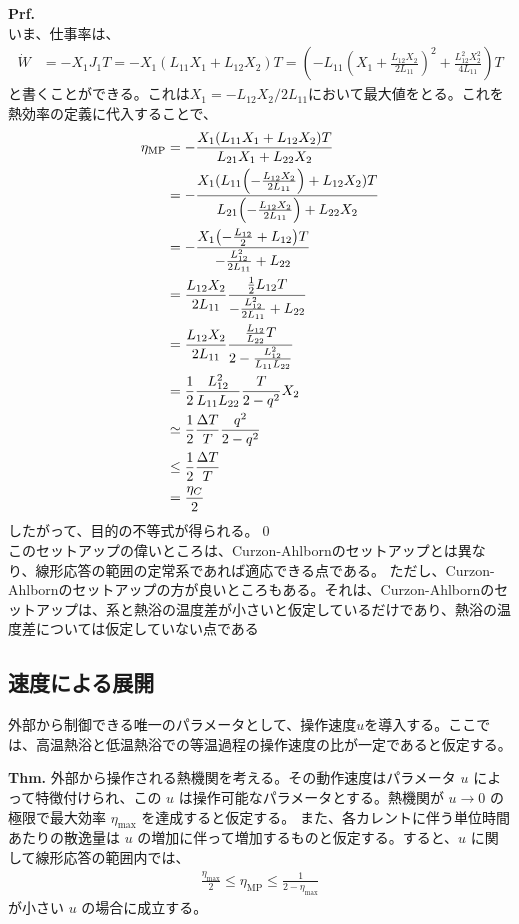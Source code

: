 \documentclass[a4paper,10.5pt]{jsarticle}
\numberwithin{equation}{section}
\begin{document}
\textbf{Prf.}\\
いま、仕事率は、
\begin{align}
  \dot{W} &= -X_1 J_1 T =-X_1(L_{11} X_1 + L_{12} X_2) T = \left(-L_{11} \left( X_1 + \frac{L_{12} X_2}{2 L_{11}} \right)^2 + \frac{L_{12}^2 X_2^2}{4 L_{11}} \right) T
\end{align}
と書くことができる。これは$X_1 = -L_{12} X_2 / 2 L_{11}$において最大値をとる。これを熱効率の定義に代入することで、
\begin{align}
  \eta_{\text{MP}} &= -\frac{X_1(L_{11} X_1 + L_{12} X_2) T}{L_{21} X_1 + L_{22} X_2} \\
  &= -\frac{X_1(L_{11}\qty(-\frac{L_{12} X_2}{2 L_{11}}) + L_{12} X_2) T}{L_{21} \qty(-\frac{L_{12} X_2}{2 L_{11}}) + L_{22} X_2} \\
  &= -\frac{X_1\qty(-\frac{L_{12}}{2}+ L_{12})T}{-\frac{L_{12}^2}{2L_{11}} + L_{22}} \\
  &= \frac{L_{12} X_2}{2 L_{11} }\frac{\frac{1}{2}L_{12}T}{-\frac{L_{12}^2}{2L_{11}} + L_{22}} \\
  &= \frac{L_{12} X_2}{2 L_{11} }\frac{\frac{L_{12}}{L_{22}}T}{2-\frac{L_{12}^2}{L_{11}L_{22}} } \\
  &= \frac{1}{2} \frac{L_{12}^2}{L_{11}L_{22}} \frac{T}{2-q^2}X_2\\
  &\simeq \frac{1}{2} \frac{\Delta T}{T} \frac{q^2}{2 - q^2} \\
  &\leq \frac{1}{2} \frac{\Delta T}{T}\\
  &= \frac{\eta_C}{2}
\end{align}
したがって、目的の不等式が得られる。\qed\\
このセットアップの偉いところは、Curzon-Ahlbornのセットアップとは異なり、線形応答の範囲の定常系であれば適応できる点である。
ただし、Curzon-Ahlbornのセットアップの方が良いところもある。それは、Curzon-Ahlbornのセットアップは、系と熱浴の温度差が小さいと仮定しているだけであり、熱浴の温度差については仮定していない点である

\subsection{速度による展開}
外部から制御できる唯一のパラメータとして、操作速度$u$を導入する。ここでは、高温熱浴と低温熱浴での等温過程の操作速度の比が一定であると仮定する。
\begin{itembox}[l]{\textbf{Thm.}}
外部から操作される熱機関を考える。その動作速度はパラメータ $u$ によって特徴付けられ、この $u$ は操作可能なパラメータとする。熱機関が $u \to 0$ の極限で最大効率 $\eta_{\text{max}}$ を達成すると仮定する。
また、各カレントに伴う単位時間あたりの散逸量は $u$ の増加に伴って増加するものと仮定する。すると、$u$ に関して線形応答の範囲内では、
\begin{align}
    \frac{\eta_{\text{max}}}{2} \leq \eta_{\text{MP}} \leq \frac{1}{2 - \eta_{\text{max}}}
\end{align}
が小さい $u$ の場合に成立する。
\end{itembox}
\end{document}
